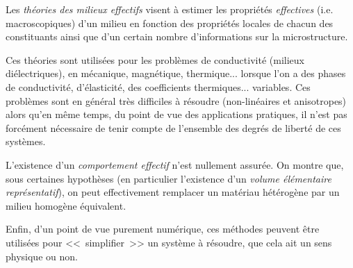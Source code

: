 \medskip
\begin{histoire}%
Les \emph{théories des milieux effectifs} visent à estimer les propriétés \emph{effectives} (i.e. macroscopiques) d'un
milieu en fonction des propriétés locales de chacun des constituants ainsi
que d'un certain nombre d'informations sur la microstructure.

\medskip
{}

\medskip
Ces théories sont utilisées pour les problèmes de conductivité (milieux diélectriques),
en mécanique, magnétique, thermique... lorsque l'on a des phases de conductivité,
d'élasticité, des coefficients thermiques... variables.
Ces problèmes sont en général très difficiles à résoudre (non-linéaires et anisotropes)
alors qu'en même temps, du point de vue des applications pratiques, il n'est pas forcément
nécessaire de tenir compte de l'ensemble des degrés de liberté de ces systèmes.

\medskip
L'existence d'un \emph{comportement effectif} n'est nullement assurée.
On montre que, sous certaines hypothèses (en particulier l'existence d'un \emph{volume
élémentaire représentatif}), on peut effectivement
remplacer un matériau hétérogène par un milieu homogène équivalent.

Enfin, d'un point de vue purement numérique, ces méthodes peuvent être
utilisées pour <<~simplifier~>> un système à résoudre, que cela ait un sens
physique ou non.
\end{histoire}

